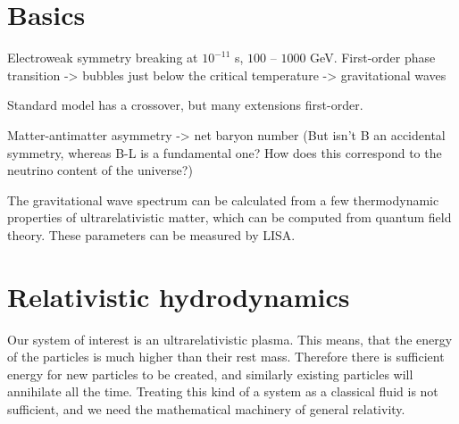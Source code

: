 \section{Basics}
Electroweak symmetry breaking at $10^{-11}$ s, $100$ -- $1000$ GeV.
First-order phase transition
-> bubbles just below the critical temperature
-> gravitational waves

Standard model has a crossover, but many extensions first-order.

Matter-antimatter asymmetry -> net baryon number
(But isn't B an accidental symmetry, whereas B-L is a fundamental one?
How does this correspond to the neutrino content of the universe?)
\cite{lecture_notes}

The gravitational wave spectrum can be calculated from a few thermodynamic properties of ultrarelativistic matter, which can be computed from quantum field theory.
These parameters can be measured by LISA.



\section{Relativistic hydrodynamics}

Our system of interest is an ultrarelativistic plasma.
This means, that the energy of the particles is much higher than their rest mass.
Therefore there is sufficient energy for new particles to be created,
and similarly existing particles will annihilate all the time.
Treating this kind of a system as a classical fluid is not sufficient,
and we need the mathematical machinery of general relativity.

